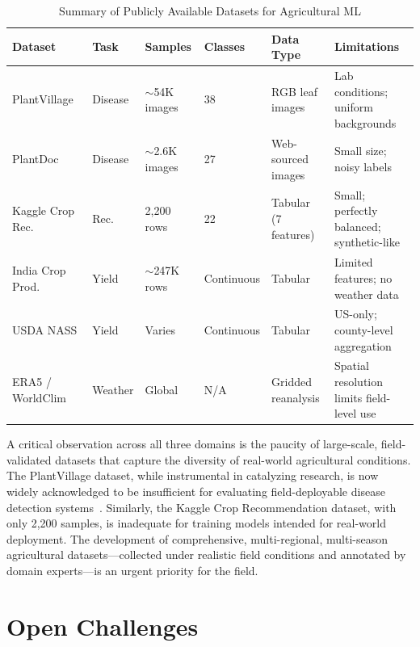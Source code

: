 \documentclass[journal]{IEEEtran}
\begin{document}
\begin{table}[htbp]
  \centering
  \caption{Summary of Publicly Available Datasets for Agricultural ML}
  \label{tab:datasets_summary}
  \begin{tabular}{L{3cm} L{1.6cm} C{1.6cm} C{1.4cm} L{2.5cm} L{3.5cm}}
    \toprule
    \textbf{Dataset} & \textbf{Task} & \textbf{Samples} & \textbf{Classes} & \textbf{Data Type} & \textbf{Limitations} \\
    \midrule
    PlantVillage~\cite{hughes2015open} & Disease & $\sim$54K images & 38 & RGB leaf images & Lab conditions; uniform backgrounds \\
    PlantDoc~\cite{singh2018plantdoc} & Disease & $\sim$2.6K images & 27 & Web-sourced images & Small size; noisy labels \\
    Kaggle Crop Rec. & Rec. & 2,200 rows & 22 & Tabular (7 features) & Small; perfectly balanced; synthetic-like \\
    India Crop Prod. & Yield & $\sim$247K rows & Continuous & Tabular & Limited features; no weather data \\
    USDA NASS & Yield & Varies & Continuous & Tabular & US-only; county-level aggregation \\
    ERA5 / WorldClim & Weather & Global & N/A & Gridded reanalysis & Spatial resolution limits field-level use \\
    \bottomrule
  \end{tabular}
\end{table}

A critical observation across all three domains is the paucity of large-scale, field-validated datasets that capture the diversity of real-world agricultural conditions. The PlantVillage dataset, while instrumental in catalyzing research, is now widely acknowledged to be insufficient for evaluating field-deployable disease detection systems~\cite{barbedo2018factors}. Similarly, the Kaggle Crop Recommendation dataset, with only 2,200 samples, is inadequate for training models intended for real-world deployment. The development of comprehensive, multi-regional, multi-season agricultural datasets---collected under realistic field conditions and annotated by domain experts---is an urgent priority for the field.


\section{Open Challenges}
\label{sec:challenges}
\end{document}

